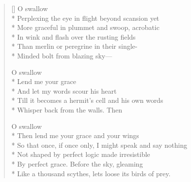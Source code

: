 \label{ch:lear_af}
\settowidth{\versewidth}{So that once, if once only, I might speak and say nothing}
\begin{verse}[\versewidth]
 O swallow\\*
Perplexing the eye in flight beyond scansion yet\\*
More graceful in plummet and swoop, acrobatic\\*
In wink and flash over the rusting fields\\*
Than merlin or peregrine in their single-\\*
Minded bolt from blazing sky---

O swallow\\*
Lend me your grace\\*
And let my words scour his heart\\*
Till it becomes a hermit's cell and his own words\\*
Whisper back from the walls. Then

O swallow\\*
Then lend me your grace and your wings\\*
So that once, if once only, I might speak and say nothing\\*
Not shaped by perfect logic made irresistible\\*
By perfect grace. Before the sky, gleaming\\*
Like a thousand scythes, lets loose its birds of prey.
\end{verse}
